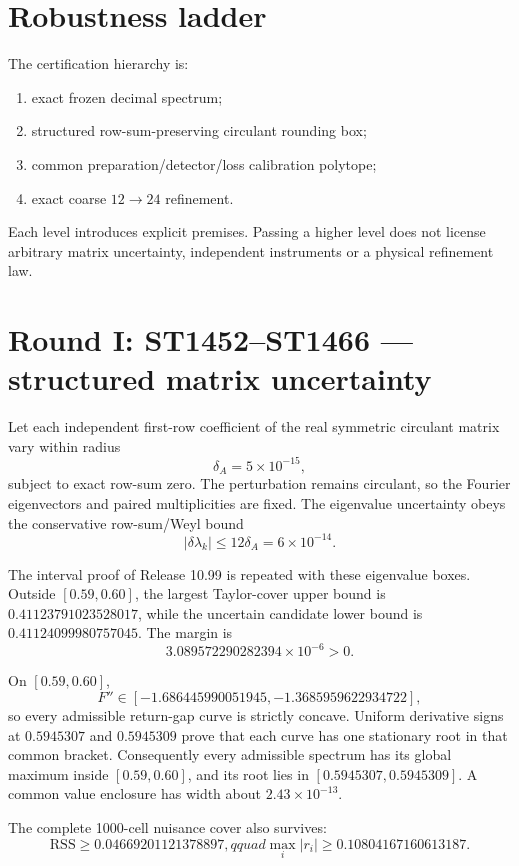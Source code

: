 \documentclass[11pt,a4paper]{article}
\begin{document}
\tableofcontents\newpage

\section{Robustness ladder}

The certification hierarchy is:
\begin{enumerate}
\item exact frozen decimal spectrum;
\item structured row-sum-preserving circulant rounding box;
\item common preparation/detector/loss calibration polytope;
\item exact coarse $12\to24$ refinement.
\end{enumerate}
Each level introduces explicit premises.  Passing a higher level does not
license arbitrary matrix uncertainty, independent instruments or a physical
refinement law.

\section{Round I: ST1452--ST1466 --- structured matrix uncertainty}

Let each independent first-row coefficient of the real symmetric circulant
matrix vary within radius
\[
\delta_A=5\times10^{-15},
\]
subject to exact row-sum zero.  The perturbation remains circulant, so the
Fourier eigenvectors and paired multiplicities are fixed.  The eigenvalue
uncertainty obeys the conservative row-sum/Weyl bound
\[
|\delta\lambda_k|\le12\delta_A=6\times10^{-14}.
\]

The interval proof of Release 10.99 is repeated with these eigenvalue boxes.
Outside $[0.59,0.60]$, the largest Taylor-cover upper bound is
$0.41123791023528017$, while the uncertain candidate lower bound is
$0.41124099980757045$.  The margin is
\[
3.089572290282394\times10^{-6}>0.
\]

On $[0.59,0.60]$,
\[
F''\in[-1.686445990051945,-1.3685959622934722],
\]
so every admissible return-gap curve is strictly concave.  Uniform derivative
signs at $0.5945307$ and $0.5945309$ prove that each curve has one stationary
root in that common bracket.  Consequently every admissible spectrum has its
global maximum inside $[0.59,0.60]$, and its root lies in
$[0.5945307,0.5945309]$.  A common value enclosure has width about
$2.43\times10^{-13}$.

The complete 1000-cell nuisance cover also survives:
\[
\mathrm{RSS}\ge0.04669201121378897,qquad
\max_i|r_i|\ge0.10804167160613187.
\]
\end{document}
